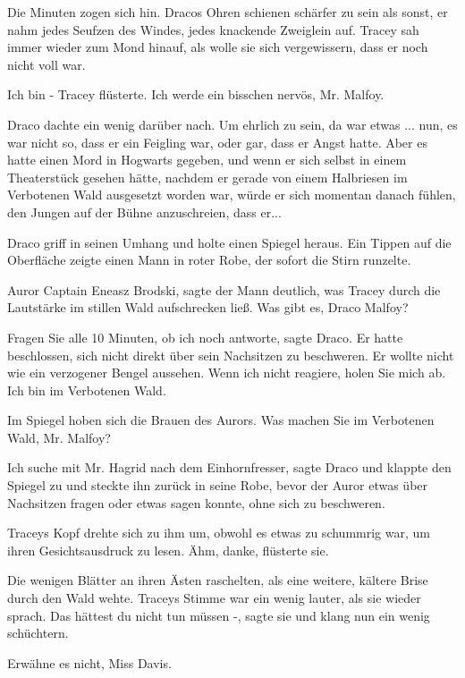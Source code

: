 Die Minuten zogen sich hin. Dracos Ohren schienen schärfer zu sein als sonst, er
nahm jedes Seufzen des Windes, jedes knackende Zweiglein auf. Tracey sah
immer wieder zum Mond hinauf, als wolle sie sich vergewissern, dass er
noch nicht voll war.

\glqq{}Ich bin -\grqq{} Tracey flüsterte. \glqq{}Ich werde ein bisschen nervös,
Mr. Malfoy.\grqq{}

Draco dachte ein wenig darüber nach. Um ehrlich zu sein, da war etwas ... nun,
es war nicht so, dass er ein Feigling war, oder gar, dass er Angst hatte.
Aber es hatte einen Mord in Hogwarts gegeben, und wenn er sich selbst in
einem Theaterstück gesehen hätte, nachdem er gerade von einem Halbriesen
im Verbotenen Wald ausgesetzt worden war, würde er sich momentan danach
fühlen, den Jungen auf der Bühne anzuschreien, dass er...

Draco griff in seinen Umhang und holte einen Spiegel heraus. Ein Tippen auf die
Oberfläche zeigte einen Mann in roter Robe, der sofort die Stirn
runzelte.

\glqq{}Auror Captain Eneasz Brodski\grqq{}, sagte der Mann deutlich, was Tracey
durch die Lautstärke im stillen Wald aufschrecken ließ. \glqq{}Was gibt
es, Draco Malfoy?\grqq{}

\glqq{}Fragen Sie alle 10 Minuten, ob ich noch antworte\grqq{}, sagte Draco. Er
hatte beschlossen, sich nicht direkt über sein Nachsitzen zu beschweren.
Er wollte nicht wie ein verzogener Bengel aussehen. \glqq{}Wenn ich nicht
reagiere, holen Sie mich ab. Ich bin im Verbotenen Wald.\grqq{}

Im Spiegel hoben sich die Brauen des Aurors. \glqq{}Was machen Sie im Verbotenen
Wald, Mr. Malfoy?\grqq{}

\glqq{}Ich suche mit Mr. Hagrid nach dem Einhornfresser\grqq{}, sagte Draco und
klappte den Spiegel zu und steckte ihn zurück in seine Robe, bevor der
Auror etwas über Nachsitzen fragen oder etwas sagen konnte, ohne sich zu
beschweren.

Traceys Kopf drehte sich zu ihm um, obwohl es etwas zu schummrig war, um ihren
Gesichtsausdruck zu lesen. \glqq{}Ähm, danke\grqq{}, flüsterte sie.

Die wenigen Blätter an ihren Ästen raschelten, als eine weitere, kältere Brise
durch den Wald wehte. Traceys Stimme war ein wenig lauter, als sie wieder
sprach. \glqq{}Das hättest du nicht tun müssen -\grqq{}, sagte sie und
klang nun ein wenig schüchtern.

\glqq{}Erwähne es nicht, Miss Davis.\grqq{}

